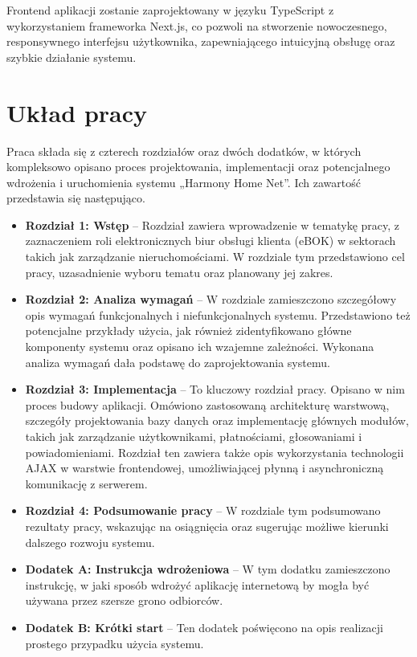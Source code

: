 Frontend aplikacji zostanie zaprojektowany w języku TypeScript z wykorzystaniem frameworka Next.js, co pozwoli na stworzenie nowoczesnego, responsywnego interfejsu użytkownika, zapewniającego intuicyjną obsługę oraz szybkie działanie systemu.

\section{Układ pracy}
Praca składa się z czterech rozdziałów oraz dwóch dodatków, w których kompleksowo opisano proces projektowania, implementacji oraz potencjalnego wdrożenia i uruchomienia systemu „Harmony Home Net”. Ich zawartość przedstawia się następująco.
\begin{itemize}
    \item \textbf{Rozdział 1: Wstęp} -- Rozdział zawiera wprowadzenie w tematykę pracy, z zaznaczeniem roli elektronicznych biur obsługi klienta (eBOK) w sektorach takich jak zarządzanie nieruchomościami. W rozdziale tym przedstawiono cel pracy, uzasadnienie wyboru tematu oraz planowany jej zakres.
    \item \textbf{Rozdział 2: Analiza wymagań} -- W rozdziale zamieszczono szczegółowy opis wymagań funkcjonalnych i niefunkcjonalnych systemu. Przedstawiono też potencjalne przykłady użycia, jak również zidentyfikowano główne komponenty systemu oraz opisano ich wzajemne zależności. Wykonana analiza wymagań dała podstawę do zaprojektowania systemu.
    \item \textbf{Rozdział 3: Implementacja} -- To kluczowy rozdział pracy. Opisano w nim proces budowy aplikacji. Omówiono zastosowaną architekturę warstwową, szczegóły projektowania bazy danych oraz implementację głównych modułów, takich jak zarządzanie użytkownikami, płatnościami, głosowaniami i powiadomieniami. Rozdział ten zawiera także opis wykorzystania technologii AJAX w warstwie frontendowej, umożliwiającej płynną i asynchroniczną komunikację z serwerem.
    \item \textbf{Rozdział 4: Podsumowanie pracy} -- W rozdziale tym podsumowano rezultaty pracy, wskazując na osiągnięcia oraz sugerując możliwe kierunki dalszego rozwoju systemu.
    \item \textbf{Dodatek A: Instrukcja wdrożeniowa} -- W tym dodatku zamieszczono instrukcję, w jaki sposób wdrożyć aplikację internetową by mogła być używana przez szersze grono odbiorców.
    \item \textbf{Dodatek B: Krótki start} -- Ten dodatek poświęcono na opis realizacji prostego przypadku użycia systemu.
\end{itemize}



